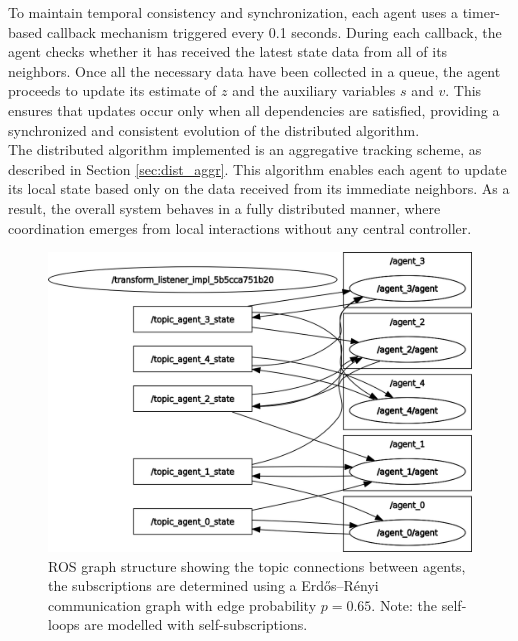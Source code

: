 To maintain temporal consistency and synchronization, each agent uses a timer-based callback mechanism triggered every 0.1 seconds. During each callback, the agent checks whether it has received the latest state data from all of its neighbors. Once all the necessary data have been collected in a queue, the agent proceeds to update its estimate of \( z \) and the auxiliary variables \( s \) and \( v \). This ensures that updates occur only when all dependencies are satisfied, providing a synchronized and consistent evolution of the distributed algorithm. \\
The distributed algorithm implemented is an aggregative tracking scheme, as described in Section \ref{sec:dist_aggr}. This algorithm enables each agent to update its local state based only on the data received from its immediate neighbors. As a result, the overall system behaves in a fully distributed manner, where coordination emerges from local interactions without any central controller.

\begin{figure}[H]
    \centering
    \includegraphics[width=0.6\linewidth]{report/figs/rosgraph_topics_agents.png}
    \caption{ROS graph structure showing the topic connections between agents, the subscriptions are determined using a Erd\H{o}s--R\'enyi communication graph with edge probability $p = 0.65$. Note: the self-loops are modelled with self-subscriptions.}
\end{figure}

